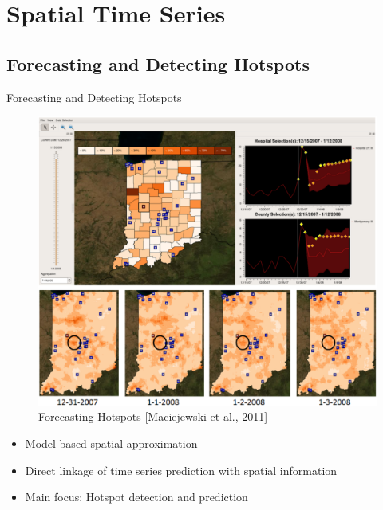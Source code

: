 \documentclass[10pt]{beamer}
\begin{document}

\section{Spatial Time Series}
\subsection{Forecasting and Detecting Hotspots}
\begin{frame}{Forecasting and Detecting Hotspots}
	\centering
	\begin{minipage}[c]{0.65\textwidth}
		\begin{figure}[htb]
			\includegraphics[width=\textwidth]{images/Hotspots_larger}
			\caption{Forecasting Hotspots [Maciejewski et al., 2011]}
		\end{figure}
	\end{minipage}
	\begin{minipage}[c]{0.325\textwidth}
			\begin{itemize}
				\item Model based spatial approximation
				\item Direct linkage of time series prediction with spatial information
				\item Main focus: Hotspot detection and prediction
			\end{itemize}
	\end{minipage}
\end{frame}
\end{document}
